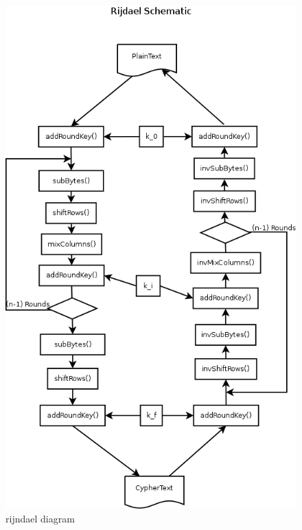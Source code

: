 \documentclass[10pt,a4paper,twoside]{llncs}
\begin{document}
\begin{figure}[h]
 \centering
 \includegraphics[scale=0.3,keepaspectratio=true]{./images/rijndaelDiagram.png}
 \caption{rijndael diagram}
 \label{fig:RijndaelDiagram}
\end{figure}

\end{document}
